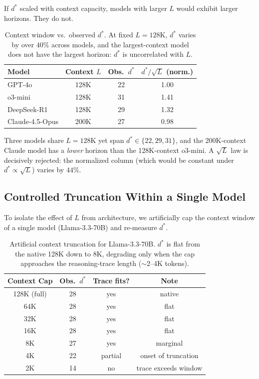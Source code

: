 \documentclass{article}
\theoremstyle{plain}
\theoremstyle{definition}
\theoremstyle{remark}
\begin{document}
If $d^*$ scaled with context capacity, models with larger $L$ would exhibit larger horizons. They do not.

\begin{table}[h]
\centering
\caption{Context window vs.\ observed $d^*$. At fixed $L = 128$K, $d^*$ varies by over $40\%$ across models, and the largest-context model does not have the largest horizon: $d^*$ is uncorrelated with $L$.}
\label{tab:context_scaling}
\small
\begin{tabular}{@{}lccc@{}}
\toprule
\textbf{Model} & \textbf{Context $L$} & \textbf{Obs.\ $d^*$} & \textbf{$d^*/\sqrt{L}$ (norm.)} \\
\midrule
GPT-4o & 128K & 22 & 1.00 \\
o3-mini & 128K & 31 & 1.41 \\
DeepSeek-R1 & 128K & 29 & 1.32 \\
Claude-4.5-Opus & 200K & 27 & 0.98 \\
\bottomrule
\end{tabular}
\end{table}

Three models share $L = 128$K yet span $d^* \in \{22, 29, 31\}$, and the 200K-context Claude model has a \emph{lower} horizon than the 128K-context o3-mini. A $\sqrt{L}$ law is decisively rejected: the normalized column (which would be constant under $d^* \propto \sqrt{L}$) varies by $44\%$.

\subsection{Controlled Truncation Within a Single Model}

To isolate the effect of $L$ from architecture, we artificially cap the context window of a single model (Llama-3.3-70B) and re-measure $d^*$.

\begin{table}[h]
\centering
\caption{Artificial context truncation for Llama-3.3-70B. $d^*$ is flat from the native 128K down to 8K, degrading only when the cap approaches the reasoning-trace length ($\sim$2--4K tokens).}
\label{tab:truncation}
\small
\begin{tabular}{@{}cccc@{}}
\toprule
\textbf{Context Cap} & \textbf{Obs.\ $d^*$} & \textbf{Trace fits?} & \textbf{Note} \\
\midrule
128K (full) & 28 & yes & native \\
64K & 28 & yes & flat \\
32K & 28 & yes & flat \\
16K & 28 & yes & flat \\
8K & 27 & yes & marginal \\
4K & 22 & partial & onset of truncation \\
2K & 14 & no & trace exceeds window \\
\bottomrule
\end{tabular}
\end{table}
\end{document}
